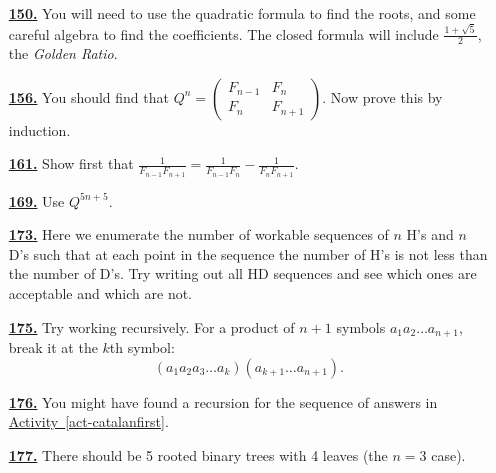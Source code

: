 \documentclass[10pt,]{book}
\theoremstyle{plain}
\theoremstyle{definition}
\theoremstyle{definition}
\theoremstyle{definition}
\numberwithin{equation}{chapter}
\newcommand{\amp}{&}
\begin{document}
\begin{itemize}[itemsep=1em]
\hypertarget{a-150}{}\item[\textbf{\hyperref[act-binet]{150.}}]
\hypertarget{p-959}{}%
You will need to use the quadratic formula to find the roots, and some careful algebra to find the coefficients.  The closed formula will include \(\frac{1+\sqrt{5}}{2}\), the \emph{Golden Ratio}.%

\hypertarget{a-156}{}\item[\textbf{\hyperref[fib-matrix]{156.}}]
\hypertarget{p-972}{}%
You should find that \(Q^n = \begin{pmatrix}
F_{n - 1} \amp F_{n}\\
F_{n} \amp F_{n + 1}
\end{pmatrix}\).  Now prove this by induction.%

\hypertarget{a-161}{}\item[\textbf{\hyperref[activity-154]{161.}}]
\hypertarget{p-978}{}%
Show first that \(\frac{1}{F_{n - 1}F_{n + 1}} = \frac{1}{F_{n - 1}F_{n}} -
\frac{1}{F_{n}F_{n + 1}}\).%

\hypertarget{a-169}{}\item[\textbf{\hyperref[activity-162]{169.}}]
\hypertarget{p-987}{}%
Use \(Q^{5n + 5}\).%

\hypertarget{a-173}{}\item[\textbf{\hyperref[act-hdseq]{173.}}]
\hypertarget{p-996}{}%
Here we enumerate the number of workable sequences of \(n\) H's and \(n\) D's such that at each point in the sequence the number of H's is not less than the number of D's.  Try writing out all HD sequences and see which ones are acceptable and which are not.%

\hypertarget{a-175}{}\item[\textbf{\hyperref[act-parenthesize]{175.}}]
\hypertarget{p-1002}{}%
Try working recursively.   For a product of \(n+1\) symbols \(a_{1}a_{2}\ldots a_{n+1}\), break it at the \(k\)th symbol:%
\begin{equation*}
(a_{1}a_{2}a_{3}\ldots a_{k})(a_{k + 1}\ldots a_{n+1}).
\end{equation*}
%

\hypertarget{a-176}{}\item[\textbf{\hyperref[act-traingulations]{176.}}]
\hypertarget{p-1004}{}%
You might have found a recursion for the sequence of answers in \hyperref[act-catalanfirst]{Activity~\ref{act-catalanfirst}}.%

\hypertarget{a-177}{}\item[\textbf{\hyperref[act-rootedtrees]{177.}}]
\hypertarget{p-1007}{}%
There should be 5 rooted binary trees with 4 leaves (the \(n = 3\) case).%


\end{itemize}
\end{document}
